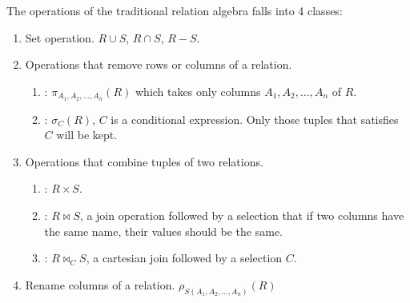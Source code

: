 The operations of the traditional relation algebra falls into 4 classes:
\begin{enumerate}
    \item Set operation. $R \cup S$, $R \cap S$, $R - S$.
    \item Operations that remove rows or columns of a relation. 
        \begin{enumerate}
            \item {}: $\pi_{A_1, A_2, \dots, A_n} (R)$ which takes only columns $A_1, A_2, \dots, A_n$ of $R$.
            \item {}: $\sigma_C (R)$, $C$ is a conditional expression. Only those tuples that satisfies $C$ will be kept.
        \end{enumerate}
    \item Operations that combine tuples of two relations.
        \begin{enumerate}
            \item {}: $R \times S$.
            \item {}: $R \Join S$, a join operation followed by a selection that if two columns have the same name, their values should be the same.
            \item {}: $R \Join_C S$, a cartesian join followed by a selection $C$.
        \end{enumerate}
    \item Rename columns of a relation. $\rho_{S(A_1, A_2, \dots, A_n)} (R)$
\end{enumerate}
























